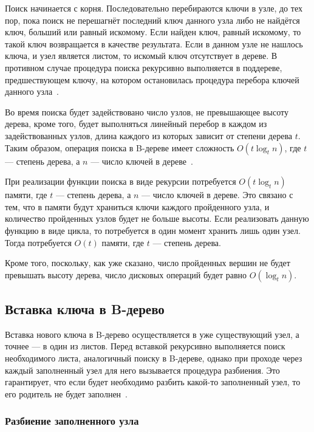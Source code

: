 \documentclass[a4paper,12pt]{article}
\begin{document}
	Поиск начинается с корня. Последовательно перебираются ключи в узле, до тех пор, пока поиск не перешагнёт последний ключ данного узла либо не найдётся ключ, больший или равный искомому. Если найден ключ, равный искомому, то такой ключ возвращается в качестве результата. Если в данном узле не нашлось ключа, и узел является листом, то искомый ключ отсутствует в дереве. В противном случае процедура поиска рекурсивно выполняется в поддереве, предшествующем ключу, на котором остановилась процедура перебора ключей данного узла~\cite{Kormen}.
	
	Во время поиска будет задействовано число узлов, не превышающее высоту дерева, кроме того, будет выполняться линейный перебор в каждом из задействованных узлов, длина каждого из которых зависит от степени дерева $t$. Таким образом, операция поиска в B-дереве имеет сложность $O(t\log_t n)$, где $t$ --- степень дерева, а $n$ --- число ключей в дереве~\cite{Kormen}.
	
	При реализации функции поиска в виде рекурсии потребуется $O(t\log_t n)$ памяти, где $t$ --- степень дерева, а $n$ --- число ключей в дереве. Это связано с тем, что в памяти будут храниться ключи каждого пройденного узла, и количество пройденных узлов будет не больше высоты. Если реализовать данную функцию в виде цикла, то потребуется в один момент хранить лишь один узел. Тогда потребуется $O(t)$ памяти, где $t$ --- степень дерева.
	
	Кроме того, поскольку, как уже сказано, число пройденных вершин не будет превышать высоту дерева, число дисковых операций будет равно $O(\log_t n)$.
	
	\subsection{Вставка ключа в B-дерево}
	
	Вставка нового ключа в B-дерево осуществляется в уже существующий узел, а точнее --- в один из листов. Перед вставкой рекурсивно выполняется поиск необходимого листа, аналогичный поиску в B-дереве, однако при проходе через каждый заполненный узел для него вызывается процедура разбиения. Это гарантирует, что если будет необходимо разбить какой-то заполненный узел, то его родитель не будет заполнен~\cite{Kormen}.
	
	\subsubsection{Разбиение заполненного узла}
	
\end{document}
